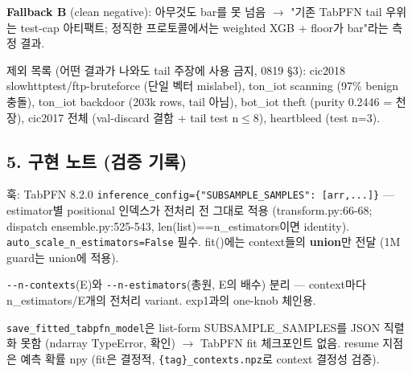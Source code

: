 \par\noindent \textbullet\enspace \textbf{Fallback B} (clean negative): 아무것도 bar를 못 넘음  \ensuremath{\rightarrow}  "기존 TabPFN tail 우위는 test-cap 아티팩트; 정직한 프로토콜에서는 weighted XGB +\allowbreak{} floor가 bar"라는 측정 결과.


제외 목록 (어떤 결과가 나와도 tail 주장에 사용 금지, 0819 §3): cic2018 slowhttptest/\allowbreak{}ftp-bruteforce (단일 벡터 mislabel), ton\_\allowbreak{}iot scanning (97\% benign 충돌), ton\_\allowbreak{}iot backdoor (203k rows, tail 아님), bot\_\allowbreak{}iot theft (purity 0.2446 =\allowbreak{} 천장), cic2017 전체 (val-discard 결함 +\allowbreak{} tail test n\ensuremath{\leq}8), heartbleed (test n=\allowbreak{}3).

\subsection{5. 구현 노트 (검증 기록)}
\par\noindent \textbullet\enspace 훅: TabPFN 8.2.0 \texttt{inferenc\allowbreak{}e\_\allowbreak{}\allowbreak{}config\allowbreak{}=\allowbreak{}\allowbreak{}\{\allowbreak{}"SUBSA\allowbreak{}MPLE\_\allowbreak{}\allowbreak{}SAM\allowbreak{}PLES": [\allowbreak{}arr,\allowbreak{}.\allowbreak{}.\allowbreak{}.\allowbreak{}]\allowbreak{}\}\allowbreak{}} — estimator별 positional 인덱스가 전처리 전 그대로 적용 (transform.py:66-68; dispatch ensemble.py:525-543, len(list)=\allowbreak{}=\allowbreak{}n\_\allowbreak{}estimators이면 identity). \texttt{auto\_\allowbreak{}\allowbreak{}sca\allowbreak{}le\_\allowbreak{}\allowbreak{}n\_\allowbreak{}\allowbreak{}est\allowbreak{}imators=\allowbreak{}\allowbreak{}False} 필수. fit()에는 context들의 \textbf{union}만 전달 (1M guard는 union에 적용).


\par\noindent \textbullet\enspace \texttt{-\allowbreak{}-\allowbreak{}n-\allowbreak{}cont\allowbreak{}exts}(E)와 \texttt{-\allowbreak{}-\allowbreak{}n-\allowbreak{}esti\allowbreak{}mators}(총원, E의 배수) 분리 — context마다 n\_\allowbreak{}estimators/\allowbreak{}E개의 전처리 variant. exp1과의 one-knob 체인용.


\par\noindent \textbullet\enspace \texttt{save\_\allowbreak{}\allowbreak{}fit\allowbreak{}ted\_\allowbreak{}\allowbreak{}tabp\allowbreak{}fn\_\allowbreak{}\allowbreak{}model\allowbreak{}}은 list-form SUBSAMPLE\_\allowbreak{}SAMPLES를 JSON 직렬화 못함 (ndarray TypeError, 확인)  \ensuremath{\rightarrow}  TabPFN fit 체크포인트 없음. resume 지점은 예측 확률 npy (fit은 결정적, \texttt{\{\allowbreak{}tag\}\allowbreak{}\_\allowbreak{}\allowbreak{}co\allowbreak{}ntexts.\allowbreak{}n\allowbreak{}pz}로 context 결정성 검증).


